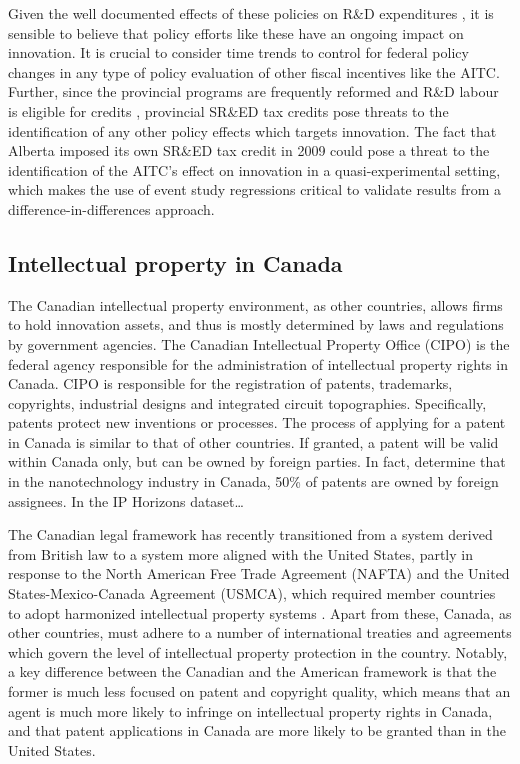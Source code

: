 \documentclass[../main.tex]{subfiles}
\begin{document}
Given the well documented effects of these policies on R\&D expenditures \parencite{mansfield_switzer85b, agrawal_etal20, becker15}, it is sensible to believe that policy efforts like these have an ongoing impact on innovation. It is crucial to consider time trends to control for federal policy changes in any type of policy evaluation of other fiscal incentives like the AITC. Further, since the provincial programs are frequently reformed and R\&D labour is eligible for credits \parencite{mckenzie05}, provincial SR\&ED tax credits pose threats to the identification of any other policy effects which targets innovation. The fact that Alberta imposed its own SR\&ED tax credit in 2009 could pose a threat to the identification of the AITC's effect on innovation in a quasi-experimental setting, which makes the use of event study regressions critical to validate results from a difference-in-differences approach.

\subsection{Intellectual property in Canada}

The Canadian intellectual property environment, as other countries, allows firms to hold innovation assets, and thus is mostly determined by laws and regulations by government agencies. The Canadian Intellectual Property Office (CIPO) is the federal agency responsible for the administration of intellectual property rights in Canada. CIPO is responsible for the registration of patents, trademarks, copyrights, industrial designs and integrated circuit topographies. Specifically, patents protect new inventions or processes. The process of applying for a patent in Canada is similar to that of other countries. If granted, a patent will be valid within Canada only, but can be owned by foreign parties. In fact, \textcite{beaudry_schiffauerova11} determine that in the nanotechnology industry in Canada, 50\% of patents are owned by foreign assignees. In the IP Horizons dataset\dots



The Canadian legal framework has recently transitioned from a system derived from British law to a system more aligned with the United States, partly in response to the North American Free Trade Agreement (NAFTA) and the United States-Mexico-Canada Agreement (USMCA), which required member countries to adopt harmonized intellectual property systems \parencite{putnam06}. Apart from these, Canada, as other countries, must adhere to a number of international treaties and agreements which govern the level of intellectual property protection in the country. Notably, a key difference between the Canadian and the American framework is that the former is much less focused on patent and copyright quality, which means that an agent is much more likely to infringe on intellectual property rights in Canada, and that patent applications in Canada are more likely to be granted than in the United States\parencite{vaver06}. 
\end{document}
